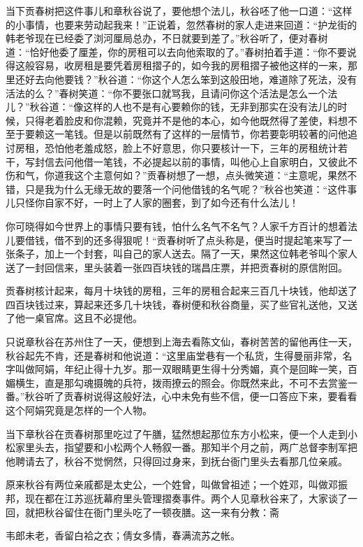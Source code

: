 \documentclass[12pt,UTF8]{ctexbook}
\begin{document}
{{{当下贡春树把这件事儿和章秋谷说了，要他想个法儿，秋谷呸了他一口道：“这样的小事情，也要来劳动起我来！”正说着，忽然春树的家人走进来回道：“护龙街的韩老爷现在已经委了浏河厘局总办，不日就要到差了。”秋谷听了，便对春树道：“恰好他委了厘差，你的房租可以去向他索取的了。”春树拍着手道：“你不要说得这般容易，收房租是要凭着房租摺子的，如今我的房租摺子被他这样的一来，那里还好去向他要钱？”秋谷道：“你这个人怎么笨到这般田地，难道除了死法，没有活法的么？”春树笑道：“你不要张口就骂我，且请问你这个活法是怎么一个法儿？”秋谷道：“像这样的人也不是有心要赖你的钱，无非到那实在没有法儿的时候，只得老着脸皮和你混赖，究竟并不是他的本心，如今他既然得了差使，料想不至于要赖这一笔钱。但是以前既然有了这样的一层情节，你若要彰明较著的问他追讨房租，恐怕他老羞成怒，脸上不好意思，你只要核计一下，三年的房租统计若干，写封信去问他借一笔钱，不必提起以前的事情，叫他心上自家明白，又彼此不伤和气，你道我这个主意何如？”贡春树想了一想，点头微笑道：“主意呢，果然不错，只是我为什么无缘无故的要落一个问他借钱的名气呢？”秋谷也笑道：“这件事儿只怪你自家不好，一时上了人家的圈套，到了如今还有什么法儿！

你可晓得如今世界上的事情只要有钱，怕什么名气不名气？人家千方百计的想着法儿要借钱，借不到的还多得狠呢！“贡春树听了点头称是，便当时提起笔来写了一张条子，加上一个封套，叫自己的家人送去。隔了一天，果然这位韩老爷叫个家人送了一封回信来，里头装着一张四百块钱的瑞昌庄票，并把贡春树的原信附回。

贡春树核计起来，每月十块钱的房租，三年的房租合起来三百几十块钱，他却送了四百块钱过来，算起来还多几十块钱，春树便和秋谷商量，买了些官礼送他，又送了他一桌官席。这且不必提他。

只说章秋谷在苏州住了一天，便想到上海去看陈文仙，春树苦苦的留他再住一天，秋谷起先不肯，还是春树和他说道：“这里庙堂巷有一个私货，生得曼丽非常，名字叫做阿娟，年纪止得十九岁。那一双眼睛更生得十分秀媚，真个是回眸一笑，百媚横生，直是那勾魂摄魄的兵符，拨雨撩云的照会。你既然来此，不可不去赏鉴一番。”秋谷听了贡春树说得这般好法，心中未免有些不信，便一口答应下来，要看看这个阿娟究竟是怎样的一个人物。

当下章秋谷在贡春树那里吃过了午膳，猛然想起那位东方小松来，便一个人走到小松家里头去，指望要和小松两个人畅叙一番。那知半个月之前，两广总督李制军把他聘请去了，秋谷不觉惘然，只得回过身来，到抚台衙门里头去看那几位亲戚。

原来秋谷有两位亲戚都是太史公，一个姓曾，叫做曾祖述；一个姓邓，叫做邓振邦，现在都在江苏巡抚幕府里头管理摺奏事件。两个人见章秋谷来了，大家谈了一回，就把秋谷留住在衙门里头吃了一顿夜膳。这一来有分教：斋

韦郎未老，香留白袷之衣；倩女多情，春满流苏之帐。

}}}
\end{document}
